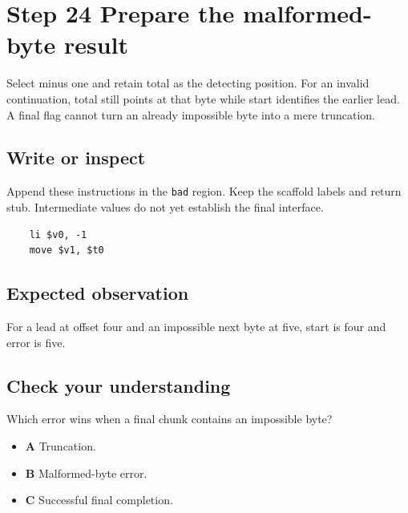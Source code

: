 \section{Step 24 Prepare the malformed-byte result}\label{utf8-s24}

Select minus one and retain total as the detecting position. For an invalid continuation, total still points at that byte while start identifies the earlier lead. A final flag cannot turn an already impossible byte into a mere truncation.

\subsection{Write or inspect}
Append these instructions in the \texttt{bad} region. Keep the scaffold labels and return stub. Intermediate values do not yet establish the final interface.

\begin{verbatim}
    li $v0, -1
    move $v1, $t0
\end{verbatim}

\subsection{Expected observation}
For a lead at offset four and an impossible next byte at five, start is four and error is five.

\subsection{Check your understanding}
Which error wins when a final chunk contains an impossible byte?

\begin{itemize}
  \item \textbf{A} Truncation.
  \item \textbf{B} Malformed-byte error.
  \item \textbf{C} Successful final completion.
\end{itemize}
